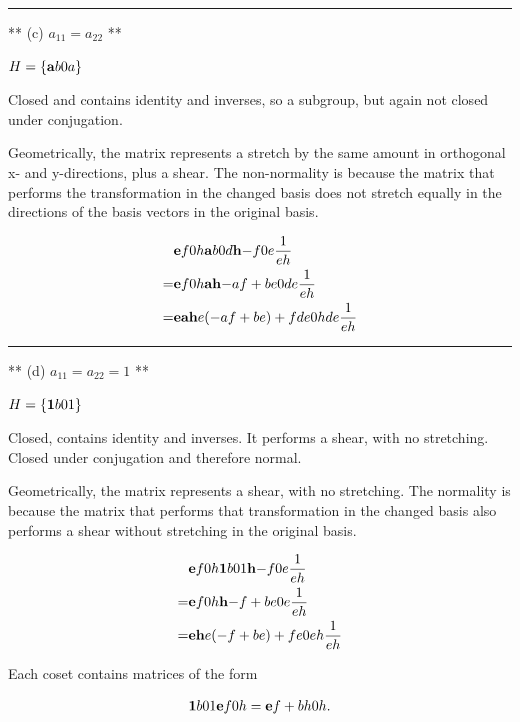 \hrule
** (c) $a_{11} = a_{22}$ **

$H = \left\{ \mathbf{a}{b}
                 {0}{a} \right\}$

Closed and contains identity and inverses, so a subgroup, but again not closed
under conjugation.

Geometrically, the matrix represents a stretch by the same amount in orthogonal
x- and y-directions, plus a shear. The non-normality is because the matrix that
performs the transformation in the changed basis does not stretch equally in
the directions of the basis vectors in the original basis.

\begin{align*}
&\mathbf{e}{f}
     {0}{h} \mathbf{a}{b}
                {0}{d} \mathbf{h}{-f}
                           {0}{e } \frac{1}{eh} \\
= &\mathbf{e}{f}
       {0}{h} \mathbf{ah}{-af + be}
                  {0 }{de      } \frac{1}{eh} \\
= &\mathbf{eah}{e(-af + be) + fde}
       {0  }{hde              } \frac{1}{eh}
\end{align*}


\hrule
** (d) $a_{11} = a_{22} = 1$ **

$H = \left\{ \mathbf{1}{b}
                 {0}{1} \right\}$

Closed, contains identity and inverses. It performs a shear, with no
stretching. Closed under conjugation and therefore normal.

Geometrically, the matrix represents a shear, with no stretching. The normality
is because the matrix that performs that transformation in the changed basis
also performs a shear without stretching in the original basis.


\begin{align*}
&\mathbf{e}{f}
     {0}{h} \mathbf{1}{b}
                {0}{1} \mathbf{h}{-f}
                           {0}{e} \frac{1}{eh} \\
= &\mathbf{e}{f}
       {0}{h} \mathbf{h}{-f + be}
                  {0}{e      } \frac{1}{eh} \\
= &\mathbf{eh}{e(-f + be) + fe}
       {0  }{eh             } \frac{1}{eh}
\end{align*}

Each coset contains matrices of the form

\begin{align*}
\mathbf{1}{b}
    {0}{1} \mathbf{e}{f}
               {0}{h} = \mathbf{e}{f + bh}
                            {0}{h     }.
\end{align*}

